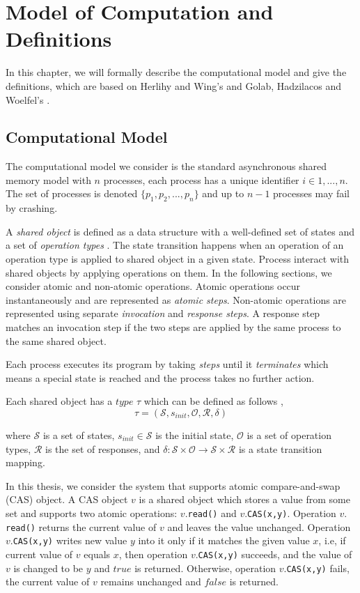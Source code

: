
\chapter{Model of Computation and Definitions}
In this chapter, we will formally describe the computational model and give the definitions, which are based on Herlihy and Wing's \cite{Herlihy:1990:LCC:78969.78972} and Golab, Hadzilacos and Woelfel's \cite{InProc-GHHW2007a}.

\section{Computational Model}
The computational model we consider is the standard asynchronous shared memory model with $n$ processes, each process has a unique identifier $i \in {1,...,n}$. The set of processes is denoted $\{p_1, p_2,...,p_n\}$ and up to $n-1$ processes may fail by crashing.

A \emph{shared object} is defined as a data structure with a well-defined set of states and a set of \emph{operation types} \cite{InProc-GHHW2007a}. The state transition happens when an operation of an operation type is applied to shared object in a given state. Process interact with shared objects by applying operations on them. In the following sections, we consider atomic and non-atomic operations. Atomic operations occur instantaneously and are represented as \emph{atomic steps}. Non-atomic operations are represented using separate \emph{invocation} and \emph{response steps}. A response step matches an invocation step if the two steps are applied by the same process to the same shared
object.

Each process executes its program by taking \emph{steps} until it \emph{terminates} which means a special state is reached and the process takes no further action.

Each shared object has a $type$ $\tau$ which can be defined as follows \cite{InProc-GHHW2007a},
$$\tau = (\mathcal{S}, s_{init},\mathcal{O},\mathcal{R} ,\delta )$$

where $\mathcal{S}$ is a set of states, $s_{init} \in \mathcal{S}$ is the initial state, $\mathcal{O}$ is a set of operation types, $\mathcal{R}$ is the set of responses, and $\delta :\mathcal{S} \times \mathcal{O} \to \mathcal{S} \times \mathcal{R}$ is a state transition mapping.

In this thesis, we consider the system that supports atomic compare-and-swap (CAS) object. A CAS object $v$ is a shared object which stores a value from some set and supports two atomic operations: $v.$\texttt{read()} and $v.$\texttt{CAS(x,y)}. Operation $v.$\texttt{read()} returns the current value of $v$ and leaves the value unchanged. Operation $v.$\texttt{CAS(x,y)} writes new value $y$ into it only if it matches the given value $x$, i.e, if current value of $v$ equals $x$, then operation $v.$\texttt{CAS(x,y)} succeeds, and the value of $v$ is changed to be $y$ and $true$ is returned. Otherwise, operation $v.$\texttt{CAS(x,y)} fails, the current value of $v$ remains unchanged and $false$ is returned.

